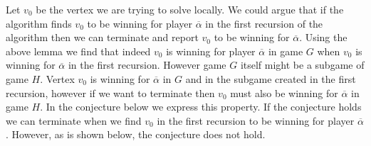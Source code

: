 Let $v_0$ be the vertex we are trying to solve locally. We could argue that if the algorithm finds $v_0$ to be winning for player $\overline{\alpha}$ in the first recursion of the algorithm then we can terminate and report $v_0$ to be winning for $\overline{\alpha}$. Using the above lemma we find that indeed $v_0$ is winning for player $\overline{\alpha}$ in game $G$ when $v_0$ is winning for $\overline{\alpha}$ in the first recursion. However game $G$ itself might be a subgame of game $H$. Vertex $v_0$ is winning for $\overline{\alpha}$ in $G$ and in the subgame created in the first recursion, however if we want to terminate then $v_0$ must also be winning for $\overline{\alpha}$ in game $H$. In the conjecture below we express this property. If the conjecture holds we can terminate when we find $v_0$ in the first recursion to be winning for player $\overline{\alpha}$. However, as is shown below, the conjecture does not hold.
